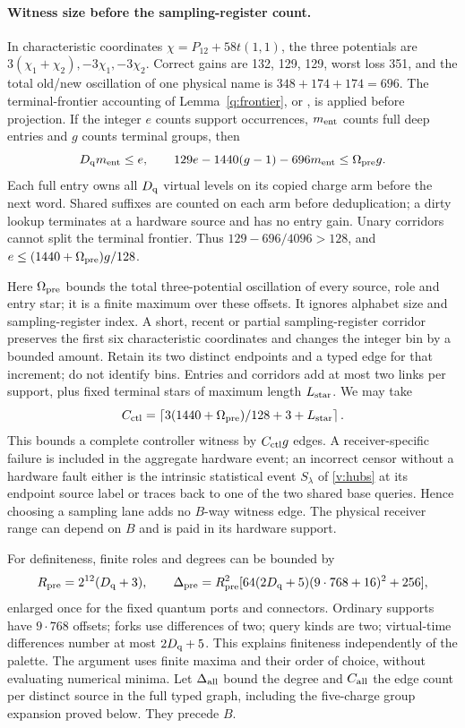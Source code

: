 \paragraph{Witness size before the sampling-register count.}
In characteristic coordinates \(\chi=P_{12}+58t(1,1)\), the three
potentials are \(3(\chi_1+\chi_2),-3\chi_1,-3\chi_2\). Correct gains
are 132, 129, 129, worst loss 351, and the total old/new oscillation of
one physical name is \(348+174+174=696\). The terminal-frontier
accounting of Lemma~\ref{q:frontier}, or
\cite[Lemmas~5.1 and~10.3]{DMNoise2026}, is applied before projection.
If the integer \(e\) counts support occurrences, \(m_{\rm ent}\) counts full deep
entries and \(g\) counts terminal groups, then
\begin{equation}\label{v:entry}
 D_{\rm q}m_{\rm ent}\le e,\qquad
 129e-1440(g-1)-696m_{\rm ent}\le\Omega_{\rm pre}g.
\end{equation}
Each full entry owns all \(D_{\rm q}\) virtual levels on its copied
charge arm before the next word. Shared suffixes are counted on
each arm before deduplication; a dirty lookup terminates at a hardware
source and has no entry gain. Unary corridors cannot split the terminal
frontier. Thus \(129-696/4096>128\), and
\(e\le(1440+\Omega_{\rm pre})g/128\).

Here \(\Omega_{\rm pre}\) bounds the total three-potential oscillation of
every source, role and entry star; it is a finite maximum over these offsets. It ignores alphabet size and sampling-register index. A short,
recent or partial sampling-register corridor preserves the first six characteristic
coordinates and changes the integer bin by a bounded amount. Retain its
two distinct endpoints and a typed edge for that increment; do not
identify bins. Entries and corridors add at most two links per support,
plus fixed terminal stars of maximum length \(L_{\rm star}\). We may take
\[
 C_{\rm ctl}=\left\lceil3(1440+\Omega_{\rm pre})/128+3+L_{\rm star}\right\rceil.
\]
This bounds a complete controller witness by \(C_{\rm ctl}g\) edges.
A receiver-specific failure is included in the aggregate hardware event;
an incorrect censor without a hardware fault either is the intrinsic statistical event \(S_\lambda\) of \eqref{v:hubs} at its endpoint source label or traces back to one of the two shared base queries. Hence
choosing a sampling lane adds no \(B\)-way witness edge. The physical
receiver range can depend on \(B\) and is paid in its hardware support.

For definiteness, finite roles and degrees can be bounded by
\[
 R_{\rm pre}=2^{12}(D_{\rm q}+3),\qquad
 \Delta_{\rm pre}=R_{\rm pre}^2
 [64(2D_{\rm q}+5)(9\cdot768+16)^2+256],
\]
enlarged once for the fixed quantum ports and connectors. Ordinary
supports have \(9\cdot768\) offsets; forks use differences of two;
query kinds are two; virtual-time differences number at most
\(2D_{\rm q}+5\). This explains finiteness independently of the palette.
The argument uses finite maxima and their order of choice, without evaluating numerical minima. Let \(\Delta_{\rm all}\) bound the degree and \(C_{\rm all}\) the edge count per distinct source in the full typed graph, including the five-charge group expansion proved below. They precede \(B\).

